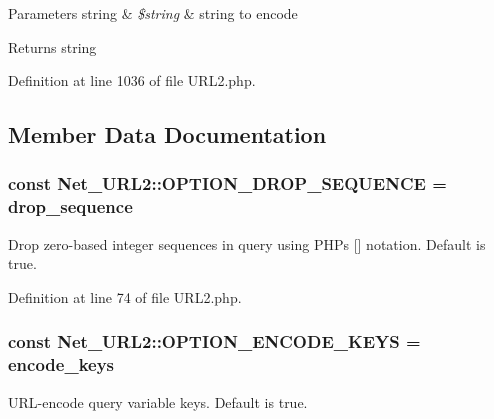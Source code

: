 \begin{DoxyParams}[1]{Parameters}
string & {\em \$string} & string to encode\\
\hline
\end{DoxyParams}
\begin{DoxyReturn}{Returns}
string 
\end{DoxyReturn}


Definition at line 1036 of file U\+R\+L2.\+php.



\subsection{Member Data Documentation}
\hypertarget{classNet__URL2_af415684f1d85246c1132203142b86499}{}
\subsubsection[{O\+P\+T\+I\+O\+N\+\_\+\+D\+R\+O\+P\+\_\+\+S\+E\+Q\+U\+E\+N\+C\+E}]{\setlength{\rightskip}{0pt plus 5cm}const Net\+\_\+\+U\+R\+L2\+::\+O\+P\+T\+I\+O\+N\+\_\+\+D\+R\+O\+P\+\_\+\+S\+E\+Q\+U\+E\+N\+C\+E = \textquotesingle{}drop\+\_\+sequence\textquotesingle{}}\label{classNet__URL2_af415684f1d85246c1132203142b86499}
Drop zero-\/based integer sequences in query using P\+H\+P\textquotesingle{}s \mbox{[}\mbox{]} notation. Default is true. 

Definition at line 74 of file U\+R\+L2.\+php.

\hypertarget{classNet__URL2_ae06ebc991de4ffe92644c5a8d37ad5ac}{}
\subsubsection[{O\+P\+T\+I\+O\+N\+\_\+\+E\+N\+C\+O\+D\+E\+\_\+\+K\+E\+Y\+S}]{\setlength{\rightskip}{0pt plus 5cm}const Net\+\_\+\+U\+R\+L2\+::\+O\+P\+T\+I\+O\+N\+\_\+\+E\+N\+C\+O\+D\+E\+\_\+\+K\+E\+Y\+S = \textquotesingle{}encode\+\_\+keys\textquotesingle{}}\label{classNet__URL2_ae06ebc991de4ffe92644c5a8d37ad5ac}
U\+R\+L-\/encode query variable keys. Default is true. 


